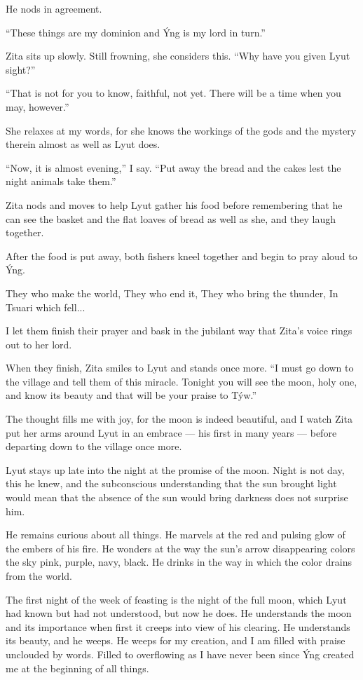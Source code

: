He nods in agreement.

``These things are my dominion and Ýng is my lord in turn.''

Zita sits up slowly. Still frowning, she considers this. ``Why have you given Lyut sight?''

``That is not for you to know, faithful, not yet. There will be a time when you may, however.''

She relaxes at my words, for she knows the workings of the gods and the mystery therein almost as well as Lyut does.

``Now, it is almost evening,'' I say. ``Put away the bread and the cakes lest the night animals take them.''

Zita nods and moves to help Lyut gather his food before remembering that he can see the basket and the flat loaves of bread as well as she, and they laugh together.

After the food is put away, both fishers kneel together and begin to pray aloud to Ýng.

They who make the world, They who end it, They who bring the thunder, In Tsuari which fell...

I let them finish their prayer and bask in the jubilant way that Zita's voice rings out to her lord.

When they finish, Zita smiles to Lyut and stands once more. ``I must go down to the village and tell them of this miracle. Tonight you will see the moon, holy one, and know its beauty and that will be your praise to Týw.''

The thought fills me with joy, for the moon is indeed beautiful, and I watch Zita put her arms around Lyut in an embrace --- his first in many years --- before departing down to the village once more.

\secdiv

Lyut stays up late into the night at the promise of the moon. Night is not day, this he knew, and the subconscious understanding that the sun brought light would mean that the absence of the sun would bring darkness does not surprise him.

He remains curious about all things. He marvels at the red and pulsing glow of the embers of his fire. He wonders at the way the sun's arrow disappearing colors the sky pink, purple, navy, black. He drinks in the way in which the color drains from the world.

The first night of the week of feasting is the night of the full moon, which Lyut had known but had not understood, but now he does. He understands the moon and its importance when first it creeps into view of his clearing. He understands its beauty, and he weeps. He weeps for my creation, and I am filled with praise unclouded by words. Filled to overflowing as I have never been since Ýng created me at the beginning of all things.

